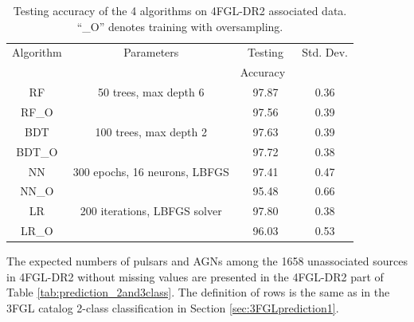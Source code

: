 \begin{table}[!h]
    \tiny
    \renewcommand{\tabcolsep}{0.4mm}
\renewcommand{\arraystretch}{1.6}

    \begin{tabular}{ c c c c }
    \hline
    \hline
    Algorithm&Parameters &  Testing&Std. Dev.\\
    & & Accuracy\ &  \\
    \hline
    RF& 50 trees, max depth 6  &97.87 & 0.36\\
    RF\_O   &&97.56&0.39 \\
    \hline
    BDT & 100 trees, max depth 2    &   97.63 &0.39\\
    BDT\_O&&97.72&0.38\\
    \hline
    NN & 300 epochs, 16 neurons, LBFGS  & 97.41 & 0.47\\
    NN\_O&&95.48&0.66\\
    \hline
    LR & 200 iterations, LBFGS solver & 97.80&0.38\\
    LR\_O&&96.03&0.53\\
    \hline
     
    \end{tabular}%
    \vspace{0.2cm}
    \caption{Testing accuracy of the 4 algorithms on 4FGL-DR2 associated data. ``\_O'' denotes training with oversampling.}
    \label{tab:selected_algs2}
\end{table}

The expected numbers of pulsars and AGNs among the 1658 unassociated sources in 4FGL-DR2 without missing values are
presented in the 4FGL-DR2 part of Table \ref{tab:prediction_2and3class}.
The definition of rows is the same as in the 3FGL catalog 2-class classification in Section \ref{sec:3FGLprediction1}.


